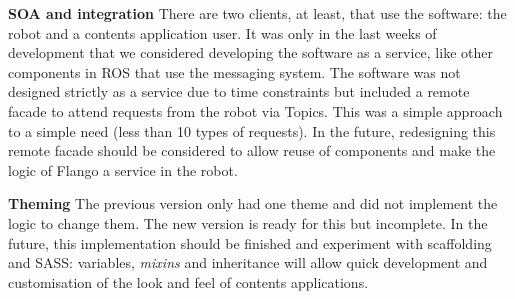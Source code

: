 \textbf{SOA and integration} There are two clients, at least, that use the software: the robot and a contents application user.
It was only in the last weeks of development that we considered developing the software as a service, like other components in \ac{ROS} that use the messaging system.
The software was not designed strictly as a service due to time constraints but included a remote facade to attend requests from the robot via Topics.
This was a simple approach to a simple need (less than 10 types of requests).
In the future, redesigning this remote facade should be considered to allow reuse of components and make the logic of Flango \cm a service in the robot.

\textbf{Theming} The previous version only had one theme and did not implement the logic to change them.
The new version is ready for this but incomplete.
In the future, this implementation should be finished and experiment with scaffolding and SASS: variables, \textit{mixins} and inheritance will allow quick development and customisation of the look and feel of contents applications.
